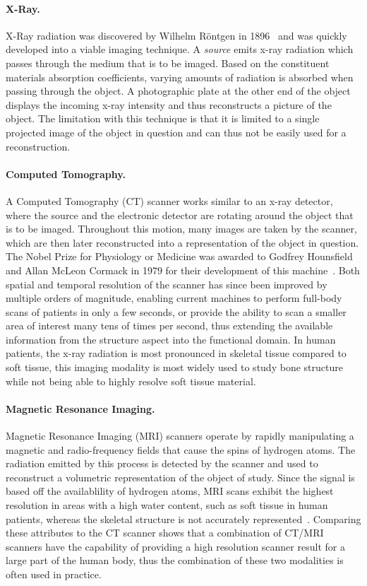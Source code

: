 \paragraph{X-Ray. } X-Ray radiation was discovered by Wilhelm R\"ontgen in 1896~\cite{rontgen1896xray} and was quickly developed into a viable imaging technique.  A \emph{source} emits x-ray radiation which passes through the medium that is to be imaged.  Based on the constituent materials absorption coefficients, varying amounts of radiation is absorbed when passing through the object.  A photographic plate at the other end of the object displays the incoming x-ray intensity and thus reconstructs a picture of the object.  The limitation with this technique is that it is limited to a single  projected image of the object in question and can thus not be easily used for a  reconstruction.

\paragraph{Computed Tomography. }  A Computed Tomography (CT) scanner works similar to an x-ray detector, where the source and the electronic detector are rotating around the object that is to be imaged.  Throughout this motion, many images are taken by the scanner, which are then later reconstructed into a  representation of the object in question.  The Nobel Prize for Physiology or Medicine was awarded to Godfrey Hounsfield and Allan McLeon Cormack in 1979 for their development of this machine~\cite{hounsfield1980computed}.  Both spatial and temporal resolution of the scanner has since been improved by multiple orders of magnitude, enabling current machines to perform full-body scans of patients in only a few seconds, or provide the ability to scan a smaller area of interest many tens of times per second, thus extending the available information from the structure aspect into the functional domain.  In human patients, the x-ray radiation is most pronounced in skeletal tissue compared to soft tissue, this imaging modality is most widely used to study bone structure while not being able to highly resolve soft tissue material.

\paragraph{Magnetic Resonance Imaging. }  Magnetic Resonance Imaging (MRI) scanners operate by rapidly manipulating a magnetic and radio-frequency fields that cause the spins of hydrogen atoms.  The radiation emitted by this process is detected by the scanner and used to reconstruct a  volumetric representation of the object of study.  Since the signal is based off the availablility of hydrogen atoms, MRI scans exhibit the highest resolution in areas with a high water content, such as soft tissue in human patients, whereas the skeletal structure is not accurately represented~\cite{damadian1971tumor}.  Comparing these attributes to the CT scanner shows that a combination of CT/MRI scanners have the capability of providing a high resolution scanner result for a large part of the human body, thus the combination of these two modalities is often used in practice.

